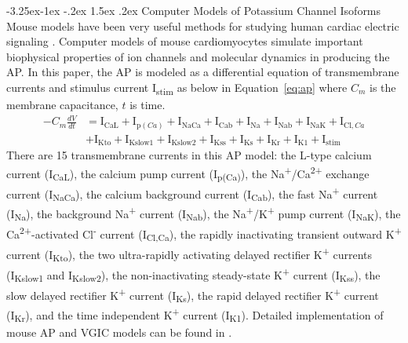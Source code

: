 \documentclass[11pt]{article}
\makeatletter
\renewcommand\subsection{\@startsection{subsection}{2}{\z@}%
                                     {-3.25ex\@plus -1ex \@minus -.2ex}%
                                     {1.5ex \@plus .2ex}%
                                     {\normalfont\fontfamily{phv}\fontsize{14}{17}\bfseries}}
\makeatother
\begin{document}
\subsection{Computer Models of Potassium Channel Isoforms}
Mouse models have been very useful methods for studying human cardiac electric signaling \citep{nerbonne2004studying,milani2014small,kim2022irx5}. Computer models of mouse cardiomyocytes simulate important biophysical properties of ion channels and molecular dynamics in producing the AP. In this paper, the AP is modeled as a differential equation of transmembrane currents and stimulus current I\textsubscript{stim} as below in Equation~\ref{eq:ap} where $C_{m}$ is the membrane capacitance, $t$ is time.
\begin{equation}
    \label{eq:ap}
    \begin{split}
    -C_{m}\frac{dV}{dt} &= \mathrm{I}_{\mathrm{CaL}}+\mathrm{I}_{\mathrm{p}(Ca)}+\mathrm{I}_{\mathrm{NaCa}}+\mathrm{I}_{\mathrm{Cab}}+\mathrm{I}_{\mathrm{Na}}+\mathrm{I}_{\mathrm{Nab}}+\mathrm{I}_{\mathrm{NaK}}+\mathrm{I}_{\mathrm{Cl},Ca} \\
    &+\mathrm{I}_{\mathrm{Kto}}+\mathrm{I}_{\mathrm{Kslow1}}+\mathrm{I}_{\mathrm{Kslow2}}+\mathrm{I}_{\mathrm{Kss}}+\mathrm{I}_{\mathrm{Ks}}+\mathrm{I}_{\mathrm{Kr}}+\mathrm{I}_{\mathrm{K1}}+\mathrm{I}_{\mathrm{stim}}
    \end{split}
\end{equation}
There are 15 transmembrane currents in this AP model: the L-type calcium current (I\textsubscript{CaL}), the calcium pump current (I\textsubscript{p(Ca)}), the Na\textsuperscript{+}/Ca\textsuperscript{2+} exchange current (I\textsubscript{NaCa}), the calcium background current (I\textsubscript{Cab}), the fast Na\textsuperscript{+} current (I\textsubscript{Na}), the background Na\textsuperscript{+} current (I\textsubscript{Nab}), the Na\textsuperscript{+}/K\textsuperscript{+} pump current (I\textsubscript{NaK}), the Ca\textsuperscript{2+}-activated Cl\textsuperscript{-} current (I\textsubscript{Cl,Ca}), the rapidly inactivating transient outward K\textsuperscript{+} current (I\textsubscript{Kto}), the two ultra-rapidly activating delayed rectifier K\textsuperscript{+} currents (I\textsubscript{Kslow1} and I\textsubscript{Kslow2}), the non-inactivating steady-state K\textsuperscript{+} current (I\textsubscript{Kss}), the slow delayed rectifier K\textsuperscript{+} current (I\textsubscript{Ks}), the rapid delayed rectifier K\textsuperscript{+} current (I\textsubscript{Kr}), and the time independent K\textsuperscript{+} current (I\textsubscript{K1}). Detailed implementation of mouse AP and VGIC models can be found in \cite{bondarenko2014compartmentalized,asfaw2020compartmentalized}.
\end{document}
